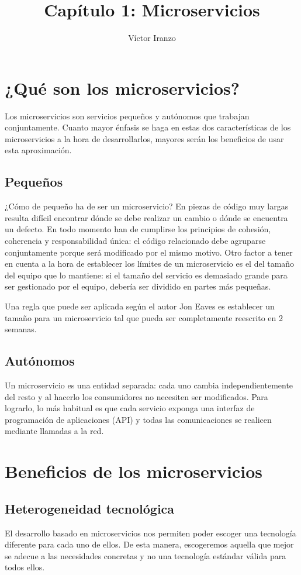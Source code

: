 \documentclass[11pt,a4paper]{article}
\author{Víctor Iranzo}
\title{Capítulo 1: Microservicios}
\begin{document}
\maketitle

\section{¿Qué son los microservicios?}
Los microservicios son servicios pequeños y autónomos que trabajan conjuntamente. Cuanto mayor énfasis se haga en estas dos características de los microservicios a la hora de desarrollarlos, mayores serán los beneficios de usar esta aproximación.

\subsection{Pequeños}
¿Cómo de pequeño ha de ser un microservicio? En piezas de código muy largas resulta difícil encontrar dónde se debe realizar un cambio o dónde se encuentra un defecto. En todo momento han de cumplirse los principios de cohesión, coherencia y responsabilidad única: el código relacionado debe agruparse conjuntamente porque será modificado por el mismo motivo. Otro factor a tener en cuenta a la hora de establecer los límites de un microservicio es el del tamaño del equipo que lo mantiene: si el tamaño del servicio es demasiado grande para ser gestionado por el equipo, debería ser dividido en partes más pequeñas.


Una regla que puede ser aplicada según el autor Jon Eaves es establecer un tamaño para un microservicio tal que pueda ser completamente reescrito en 2 semanas.

\subsection{Autónomos}
Un microservicio es una entidad separada: cada uno cambia independientemente del resto y al hacerlo los consumidores no necesiten ser modificados. Para lograrlo, lo más habitual es que cada servicio exponga una interfaz de programación de aplicaciones (API) y todas las comunicaciones se realicen mediante llamadas a la red.

\section{Beneficios de los microservicios}
\subsection{Heterogeneidad tecnológica}
El desarrollo basado en microservicios nos permiten poder escoger una tecnología diferente para cada uno de ellos. De esta manera, escogeremos aquella que mejor se adecue a las necesidades concretas y no una tecnología estándar válida para todos ellos.
 
\end{document}
